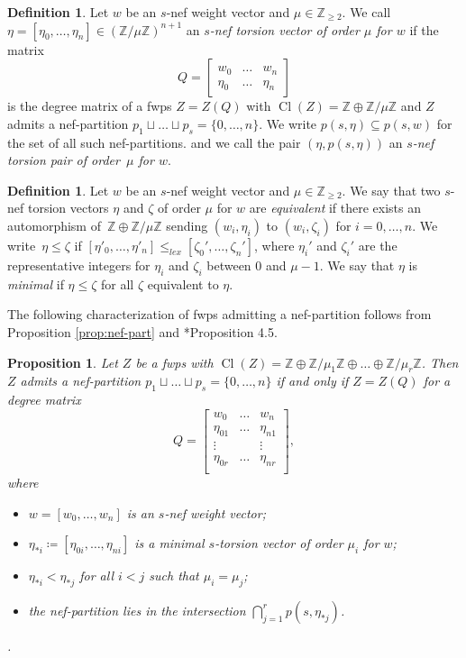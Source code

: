 \documentclass{amsart}
\DeclareMathOperator{\Cl}{Cl}
\newcommand{\Z}{\mathbb{Z}}
\newtheorem{proposition}[lem]{Proposition}
\theoremstyle{definition}
\newtheorem{definition}[lem]{Definition}
\begin{document}
\begin{definition}\label{def: torsion_vec}
    Let $w$ be an $s$-nef weight vector and $\mu\in\Z_{\geq 2}$. We call~$\eta=[\eta_0,\dots,\eta_n]\in(\Z/\mu\Z)^{n+1}$ an \emph{$s$-nef torsion vector of order $\mu$ for $w$ }if the matrix
    $$Q=\begin{bmatrix}
        w_0&\dots & w_n\\
        \eta_0 & \dots & \eta_n
    \end{bmatrix}$$
    is the degree matrix of a fwps $Z=Z(Q)$ with $\Cl(Z)=\Z\oplus\Z/\mu\Z$ and $Z$ admits a nef-partition $p_1\sqcup\dots\sqcup p_s=\{0,\dots,n\}$. We write $p(s,\eta)\subseteq p(s,w)$ for the set of all such nef-partitions. and we call the pair $(\eta,p(s,\eta))$ an \emph{$s$-nef torsion pair of order~$\mu$ for $w$}.
    \end{definition}
    
    \begin{definition}
    Let $w$ be an $s$-nef weight vector and $\mu\in\Z_{\geq 2}$. We say that two $s$-nef torsion vectors $\eta$ and $\zeta$ of order $\mu$ for $w$ are \emph{equivalent} if there exists an automorphism of~$\Z\oplus\Z/\mu\Z$ sending $(w_i,\eta_i)$ to $(w_i,\zeta_i)$ for $i=0,\dots,n$. We write~$\eta\leq\zeta$ if $[\eta'_0,\dots,\eta'_n]\leq_{lex}[\zeta_0',\dots,\zeta_n']$, where $\eta_i'$ and $\zeta_i'$ are the representative integers for $\eta_i$ and $\zeta_i$ between $0$ and $\mu-1$. We say that $\eta$ is \emph{minimal} if $\eta\leq\zeta$ for all $\zeta$ equivalent to $\eta$.
\end{definition}

The following characterization of fwps admitting a nef-partition follows from Proposition \ref{prop:nef-part} and \cite{Ghi}*{Proposition 4.5}.

\begin{proposition}\label{prop:gor_matrix}
    Let $Z$ be a fwps with $\Cl(Z)=\Z\oplus\Z/\mu_1\Z\oplus\dots\oplus\Z/\mu_r\Z$. Then $Z$ admits a nef-partition $p_1\sqcup\dots\sqcup p_s=\{0,\dots,n\}$ if and only if $Z=Z(Q)$ for a degree matrix $$Q=\begin{bmatrix}
        w_0 & \dots & w_n\\
        \eta_{01} & \dots & \eta_{n1} \\
        \vdots & & \vdots \\
        \eta_{0r} & \dots & \eta_{nr} \\
    \end{bmatrix},$$
    where \begin{itemize}
        \item $w=[w_0,\dots,w_n]$ is an $s$-nef weight vector;
        \item $\eta_{\ast i}\coloneqq[\eta_{0i},\dots,\eta_{ni}]$ is a minimal $s$-torsion vector of order $\mu_i$ for $w$;
        \item $\eta_{\ast i}< \eta_{\ast j}$ for all $i<j$ such that $\mu_i=\mu_j$;
        \item the nef-partition lies in the intersection $\bigcap_{j=1}^rp(s,\eta_{\ast j})$.
    \end{itemize}.
\end{proposition}
\end{document}
